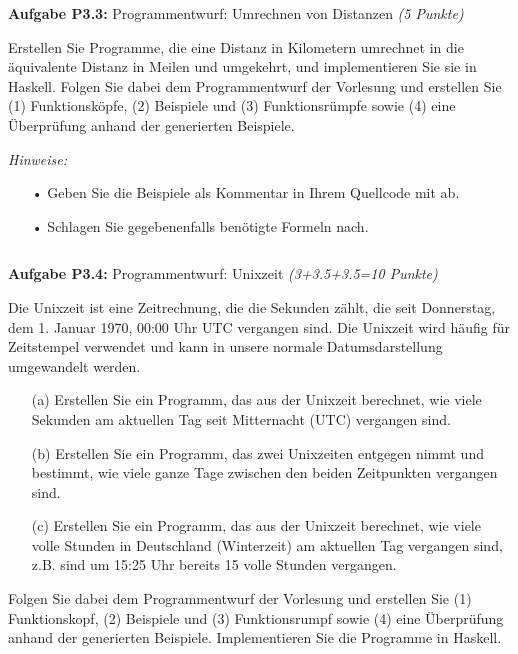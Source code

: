 \newpage

\textbf{Aufgabe P3.3:} Programmentwurf: Umrechnen von Distanzen \textit{(5 Punkte)} 

Erstellen Sie Programme, die eine Distanz in Kilometern umrechnet in die äquivalente Distanz in Meilen und umgekehrt, und implementieren Sie sie in Haskell. Folgen Sie dabei dem Programmentwurf der Vorlesung und erstellen Sie (1) Funktionsköpfe, (2) Beispiele und (3) Funktionsrümpfe sowie (4) eine Überprüfung anhand der generierten Beispiele.

\textit{Hinweise:}
\begin{itemize}
  \item [•] Geben Sie die Beispiele als Kommentar in Ihrem Quellcode mit ab.

  \item [•] Schlagen Sie gegebenenfalls benötigte Formeln nach.
\end{itemize}

\begin{itemize}
  \item [] \inputminted{Haskell}{P3_3.hs}
\end{itemize}

\newpage

\textbf{Aufgabe P3.4:} Programmentwurf: Unixzeit \textit{(3+3.5+3.5=10 Punkte)}

Die Unixzeit ist eine Zeitrechnung, die die Sekunden zählt, die seit Donnerstag, dem 1. Januar 1970, 00:00 Uhr UTC vergangen sind. Die Unixzeit wird häufig für Zeitstempel verwendet und kann in unsere normale Datumsdarstellung umgewandelt werden.

\begin{itemize}
  \item [(a)] Erstellen Sie ein Programm, das aus der Unixzeit berechnet, wie viele Sekunden am aktuellen Tag seit Mitternacht (UTC) vergangen sind.

  \item [(b)] Erstellen Sie ein Programm, das zwei Unixzeiten entgegen nimmt und bestimmt, wie viele ganze Tage zwischen den beiden Zeitpunkten vergangen sind.  \item [(c)] Erstellen Sie ein Programm, das aus der Unixzeit berechnet, wie viele volle Stunden in Deutschland (Winterzeit) am aktuellen Tag vergangen sind, z.B. sind um 15:25 Uhr bereits 15 volle Stunden vergangen.
\end{itemize}


Folgen Sie dabei dem Programmentwurf der Vorlesung und erstellen Sie (1) Funktionskopf, (2) Beispiele und (3) Funktionsrumpf sowie (4) eine Überprüfung anhand der generierten Beispiele. Implementieren Sie die Programme in Haskell.


